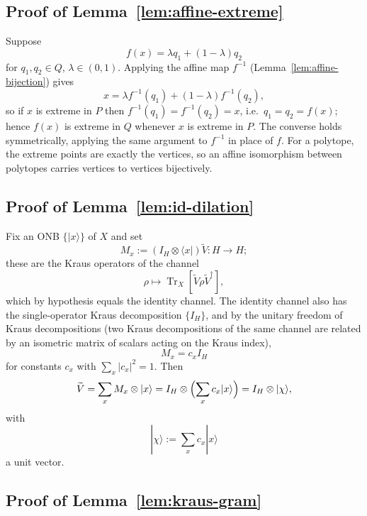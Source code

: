 \documentclass[11pt]{article}
\DeclareMathOperator{\Tr}{Tr}
\begin{document}
\subsection*{Proof of Lemma~\ref{lem:affine-extreme}}

Suppose
\[
f(x)=\lambda q_1+(1-\lambda)q_2
\]
for $q_1,q_2\in Q$, $\lambda\in(0,1)$. Applying the affine map $f^{-1}$
(Lemma~\ref{lem:affine-bijection}) gives
\[
x=\lambda f^{-1}(q_1)+(1-\lambda)f^{-1}(q_2),
\]
so if $x$ is extreme in $P$ then
$f^{-1}(q_1)=f^{-1}(q_2)=x$, i.e.\ $q_1=q_2=f(x)$; hence $f(x)$ is
extreme in $Q$ whenever $x$ is extreme in $P$. The converse holds
symmetrically, applying the same argument to $f^{-1}$ in place of $f$. For
a polytope, the extreme points are exactly the vertices, so an affine
isomorphism between polytopes carries vertices to vertices bijectively.

\subsection*{Proof of Lemma~\ref{lem:id-dilation}}

Fix an ONB $\{|x\rangle\}$ of $X$ and set
\[
M_x:=(I_H\otimes\langle x|)\widetilde V:H\to H;
\]
these are the Kraus operators of the channel
\[
\rho\longmapsto\Tr_X[\widetilde V\rho\widetilde V^\dagger],
\]
which by hypothesis equals the identity channel. The identity channel also
has the single-operator Kraus decomposition $\{I_H\}$, and by the unitary
freedom of Kraus decompositions \cite{HellwigKraus1969} (two Kraus
decompositions of the same channel are related by an isometric matrix of
scalars acting on the Kraus index),
\[
M_x=c_xI_H
\]
for constants $c_x$ with $\sum_x|c_x|^2=1$. Then
\[
\widetilde V
=
\sum_x M_x\otimes|x\rangle
=
I_H\otimes\Bigl(\sum_x c_x|x\rangle\Bigr)
=
I_H\otimes|\chi\rangle,
\]
with
\[
|\chi\rangle:=\sum_x c_x|x\rangle
\]
a unit vector.

\subsection*{Proof of Lemma~\ref{lem:kraus-gram}}
\end{document}
